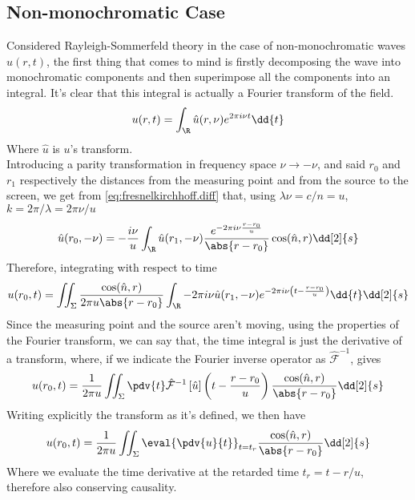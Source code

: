 \documentclass[../electromagnetism.tex]{subfiles}
\begin{document}
\subsection{Non-monochromatic Case}
Considered Rayleigh-Sommerfeld theory in the case of non-monochromatic waves $u(r,t)$, the first thing that comes to mind is firstly decomposing the wave into monochromatic components and then superimpose all the components into an integral. It's clear that this integral is actually a Fourier transform of the field.
\begin{equation*}
	u(r,t)=\int_{\R}\hat{u}(r,\nu)e^{2\pi i\nu t}\dd{t}
\end{equation*}
Where $\hat{u}$ is $u$'s transform.\\
Introducing a parity transformation in frequency space $\nu\to-\nu$, and said $r_0$ and $r_1$ respectively the distances from the measuring point and from the source to the screen, we get from \eqref{eq:fresnelkirchhoff.diff} that, using $\lambda\nu=c/n=u$, $k=2\pi/\lambda=2\pi\nu/u$
\begin{equation}
	\hat{u}(r_0,-\nu)=-\frac{i\nu}{u}\int_{\R} \hat{u}(r_1,-\nu)\frac{e^{-2\pi i\nu\frac{r-r_0}{u}}}{\abs{r-r_0}}\cos(\hat{n},r)\dd[2]{s}
	\label{eq:ftrans-nmn.diff}
\end{equation}
Therefore, integrating with respect to time
\begin{equation}
	u(r_0,t)=\iint_\Sigma\frac{\cos(\hat{n},r)}{2\pi u\abs{r-r_0}}\int_{\R} -2\pi i\nu\hat{u}(r_1,-\nu)e^{-2\pi i\nu\left( t-\frac{r-r_0}{u} \right)}\dd{t}\dd[2]{s}
	\label{eq:nmwavealmost.diff}
\end{equation}
Since the measuring point and the source aren't moving, using the properties of the Fourier transform, we can say that, the time integral is just the derivative of a transform, where, if we indicate the Fourier inverse operator as $\hat{\mathcal{F}}^{-1}$, gives
\begin{equation}
	u(r_0,t)=\frac{1}{2\pi u}\iint_\Sigma\pdv{t}\hat{\mathcal{F}}^{-1}\left[ \hat{u} \right]\left( t-\frac{r-r_0}{u} \right)\frac{\cos(\hat{n},r)}{\abs{r-r_0}}\dd[2]{s}
	\label{eq:part1-hf.diff}
\end{equation}
Writing explicitly the transform as it's defined, we then  have
\begin{equation}
	u(r_0,t)=\frac{1}{2\pi u}\iint_\Sigma\eval{\pdv{u}{t}}_{t=t_r}\frac{\cos(\hat{n},r)}{\abs{r-r_0}}\dd[2]{s}
	\label{eq:huygensfresnel-nm.diff}
\end{equation}
Where we evaluate the time derivative at the retarded time $t_r=t-r/u$, therefore also conserving causality.
\end{document}
